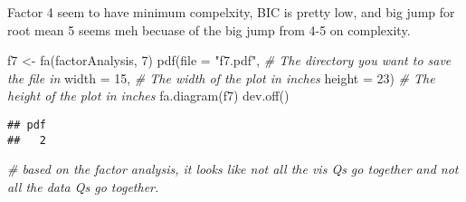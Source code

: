 \documentclass[
]{article}
\newenvironment{Shaded}{\begin{snugshade}}{\end{snugshade}}
\newcommand{\AttributeTok}[1]{\textcolor[rgb]{0.77,0.63,0.00}{#1}}
\newcommand{\CommentTok}[1]{\textcolor[rgb]{0.56,0.35,0.01}{\textit{#1}}}
\newcommand{\DecValTok}[1]{\textcolor[rgb]{0.00,0.00,0.81}{#1}}
\newcommand{\FunctionTok}[1]{\textcolor[rgb]{0.00,0.00,0.00}{#1}}
\newcommand{\NormalTok}[1]{#1}
\newcommand{\OtherTok}[1]{\textcolor[rgb]{0.56,0.35,0.01}{#1}}
\newcommand{\StringTok}[1]{\textcolor[rgb]{0.31,0.60,0.02}{#1}}
\begin{document}
Factor 4 seem to have minimum compelxity, BIC is pretty low, and big
jump for root mean 5 seems meh becuase of the big jump from 4-5 on
complexity.

\begin{Shaded}
\begin{Highlighting}[]
\NormalTok{f7 }\OtherTok{\textless{}{-}} \FunctionTok{fa}\NormalTok{(factorAnalysis, }\DecValTok{7}\NormalTok{)}
\FunctionTok{pdf}\NormalTok{(}\AttributeTok{file =} \StringTok{"f7.pdf"}\NormalTok{,   }\CommentTok{\# The directory you want to save the file in}
    \AttributeTok{width =} \DecValTok{15}\NormalTok{, }\CommentTok{\# The width of the plot in inches}
    \AttributeTok{height =} \DecValTok{23}\NormalTok{) }\CommentTok{\# The height of the plot in inches}
\FunctionTok{fa.diagram}\NormalTok{(f7)}
\FunctionTok{dev.off}\NormalTok{()}
\end{Highlighting}
\end{Shaded}

\begin{verbatim}
## pdf 
##   2
\end{verbatim}

\begin{Shaded}
\begin{Highlighting}[]
\CommentTok{\# based on the factor analysis, it looks like not all the vis Qs go together and not all the data Qs go together. }
\end{Highlighting}
\end{Shaded}
\end{document}
